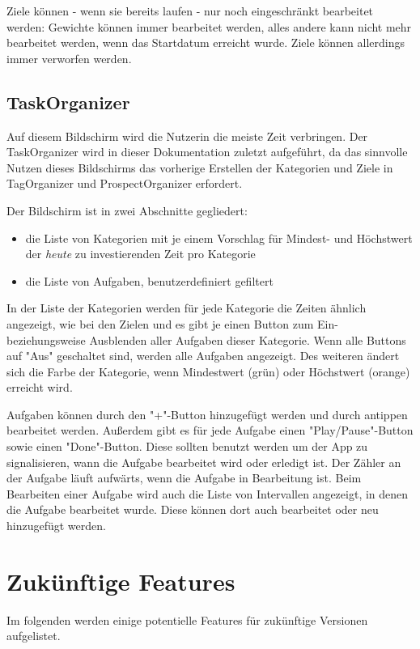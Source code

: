 \documentclass[10pt,a4paper]{article}
\begin{document}
Ziele können - wenn sie bereits laufen - nur noch eingeschränkt bearbeitet werden: Gewichte können immer bearbeitet werden, alles andere kann nicht mehr bearbeitet werden, wenn das Startdatum erreicht wurde. Ziele können allerdings immer verworfen werden.

\subsection{TaskOrganizer}
Auf diesem Bildschirm wird die Nutzerin die meiste Zeit verbringen. Der TaskOrganizer wird in dieser Dokumentation zuletzt aufgeführt, da das sinnvolle Nutzen dieses Bildschirms das vorherige Erstellen der Kategorien und Ziele in TagOrganizer und ProspectOrganizer erfordert.

Der Bildschirm ist in zwei Abschnitte gegliedert:
\begin{itemize}
	\item die Liste von Kategorien mit je einem Vorschlag für Mindest- und Höchstwert der \textit{heute} zu investierenden Zeit pro Kategorie
	\item die Liste von Aufgaben, benutzerdefiniert gefiltert
\end{itemize}
In der Liste der Kategorien werden für jede Kategorie die Zeiten ähnlich angezeigt, wie bei den Zielen und es gibt je einen Button zum Ein- beziehungsweise Ausblenden aller Aufgaben dieser Kategorie. Wenn alle Buttons auf "Aus" geschaltet sind, werden alle Aufgaben angezeigt. Des weiteren ändert sich die Farbe der Kategorie, wenn Mindestwert (grün) oder Höchstwert (orange) erreicht wird. 

Aufgaben können durch den "+"-Button hinzugefügt werden und durch antippen bearbeitet werden. Außerdem gibt es für jede Aufgabe einen "Play/Pause"-Button sowie einen "Done"-Button. Diese sollten benutzt werden um der App zu signalisieren, wann die Aufgabe bearbeitet wird oder erledigt ist. Der Zähler an der Aufgabe läuft aufwärts, wenn die Aufgabe in Bearbeitung ist. Beim Bearbeiten einer Aufgabe wird auch die Liste von Intervallen angezeigt, in denen die Aufgabe bearbeitet wurde. Diese können dort auch bearbeitet oder neu hinzugefügt werden.

\section{Zukünftige Features}
Im folgenden werden einige potentielle Features für zukünftige Versionen aufgelistet. 
\end{document}
